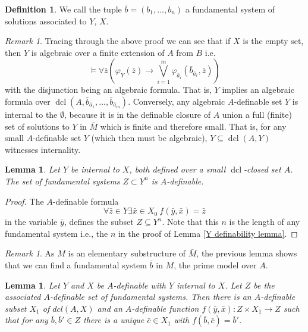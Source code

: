 \documentclass{amsart}
\newtheorem{lemma}[theorem]{Lemma}
\theoremstyle{definition}
\newtheorem{definition}[theorem]{Definition}
\theoremstyle{remark}
\newtheorem{remark}[theorem]{Remark}
\numberwithin{equation}{section}
\def \dcl {\operatorname{dcl}}
\begin{document}
\begin{definition}
We call the tuple $\bar{b} = (b_1,...,b_n)$ a fundamental system of solutions associated to $Y$, $X$.
\end{definition}

\begin{remark}
Tracing through the above proof we can see that if $X$ is the empty set, then $Y$ is algebraic over a finite extension of $A$ from $B$ i.e. $$\models \forall \bar{z}\left(\varphi_Y(\bar{z}) \to \bigvee_{i=1}^m\varphi_{\bar{a}_i}(\bar{b}_{\bar{a}_i},\bar{z}) \right)$$ with the disjunction being an algebraic formula. That is, $Y$ implies an algebraic formula over $\dcl(A,\bar{b}_{\bar{a}_1},...,\bar{b}_{\bar{a}_m})$. Conversely, any algebraic $A$-definable set $Y$ is internal to the $\emptyset$, because it is in the definable closure of $A$ union a full (finite) set of solutions to $Y$ in $\bar{M}$ which is finite and therefore small. That is, for any small $A$-definable set $Y$ (which then must be algebraic), $Y \subseteq \dcl(A,Y)$ witnesses internality.
\end{remark}

\begin{lemma}\label{lem: Z A def}
Let $Y$ be internal to $X$, both defined over a small $\dcl$-closed set $A$. The set of fundamental systems $Z \subset Y^n$ is $A$-definable.   
\end{lemma}

\begin{proof}
The $A$-definable formula $$\forall \bar{z} \in Y \exists \bar{x} \in X_0 \ f(\bar{y},\bar{x}) = \bar{z}$$ in the variable $\bar{y}$, defines the subset $Z \subseteq Y^n$. Note that this $n$ is the length of any fundamental system i.e., the $n$ in the proof of Lemma \ref{Y definability lemma}.
\end{proof}

\begin{remark}\label{fundsysinM}
As $M$ is an elementary substructure of $\bar{M}$, the previous lemma shows that we can find a fundamental system $\bar{b}$ in $M$, the prime model over $A$.
\end{remark}

\begin{lemma}\label{lem: xyz1f}
    Let $Y$ and $X$ be $A$-definable with $Y$ internal to $X$. Let $Z$ be the associated $A$-definable set of fundamental systems.  Then there is an $A$-definable subset $X_1$ of $dcl(A,X)$ and an $A$-definable function $f(\bar{y},\bar{x}): Z \times X_1 \to Z$ such that for any $\bar{b},\bar{b}' \in Z$ there is a unique $\bar{c} \in X_1$ with $f(\bar{b},\bar{c}) = \bar{b}'$.
\end{lemma}
\end{document}
